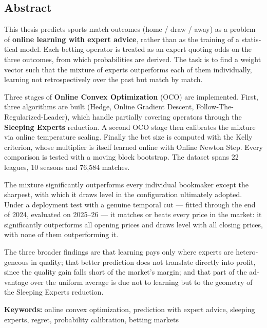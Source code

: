 \documentclass[12pt,a4paper,oneside]{report}
\renewcommand{\_}{\oldunderscore\allowbreak}
\theoremstyle{definition}
\theoremstyle{plain}
\theoremstyle{remark}
\begin{document}
\cleardoublepage

\begin{english}
\chapter*{Abstract}

This thesis predicts sports match outcomes (home / draw / away) as a problem of
\textbf{online learning with expert advice}, rather than as the training of a statistical
model. Each betting operator is treated as an expert quoting odds on the three outcomes,
from which probabilities are derived. The task is to find a weight vector such that the
mixture of experts outperforms each of them individually, learning not retrospectively over
the past but match by match.

Three stages of \textbf{Online Convex Optimization} (OCO) are implemented. First, three
algorithms are built (Hedge, Online Gradient Descent, Follow-The-Regularized-Leader), which
handle partially covering operators through the \textbf{Sleeping Experts} reduction. A second
OCO stage then calibrates the mixture via online temperature scaling. Finally the bet size is
computed with the Kelly criterion, whose multiplier is itself learned online with Online
Newton Step. Every comparison is tested with a moving block bootstrap. The dataset spans
22 leagues, 10 seasons and 76,584 matches.

The mixture significantly outperforms every individual bookmaker except the sharpest, with
which it draws level in the configuration ultimately adopted. Under a deployment test with a
genuine temporal cut --- fitted through the end of 2024, evaluated on 2025--26 --- it
matches or beats every price in the market: it significantly outperforms all opening prices
and draws level with all closing prices, with none of them outperforming it.

The three broader findings are that learning pays only where experts are heterogeneous in
quality; that better prediction does not translate directly into profit, since the quality
gain falls short of the market's margin; and that part of the advantage over the uniform
average is due not to learning but to the geometry of the Sleeping Experts reduction.

\vspace{1em}
\noindent\textbf{Keywords:} online convex optimization, prediction with expert advice,
sleeping experts, regret, probability calibration, betting markets
\end{english}
\end{document}

